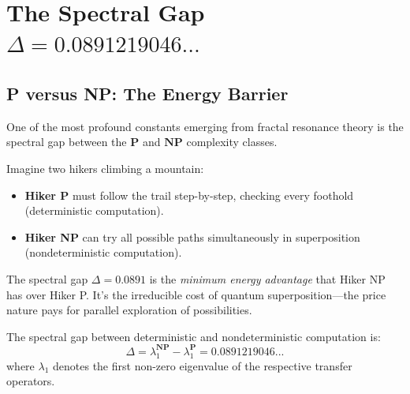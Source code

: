 \section{The Spectral Gap \texorpdfstring{$\Delta = 0.0891219046...$}{Delta = 0.0891219046...}}

\subsection{P versus NP: The Energy Barrier}

One of the most profound constants emerging from fractal resonance theory is the spectral gap between the $\mathbf{P}$ and $\mathbf{NP}$ complexity classes.

\begin{intuitive}
Imagine two hikers climbing a mountain:
\begin{itemize}
\item \textbf{Hiker P} must follow the trail step-by-step, checking every foothold (deterministic computation).
\item \textbf{Hiker NP} can try all possible paths simultaneously in superposition (nondeterministic computation).
\end{itemize}

The spectral gap $\Delta = 0.0891$ is the \textit{minimum energy advantage} that Hiker NP has over Hiker P. It's the irreducible cost of quantum superposition---the price nature pays for parallel exploration of possibilities.
\end{intuitive}

\begin{thm}\label{thm:p-np-gap}
The spectral gap between deterministic and nondeterministic computation is:
\begin{equation}
\boxed{\Delta = \lambda_1^{\mathbf{NP}} - \lambda_1^{\mathbf{P}} = 0.0891219046...}
\end{equation}
where $\lambda_1$ denotes the first non-zero eigenvalue of the respective transfer operators.
\end{thm}

